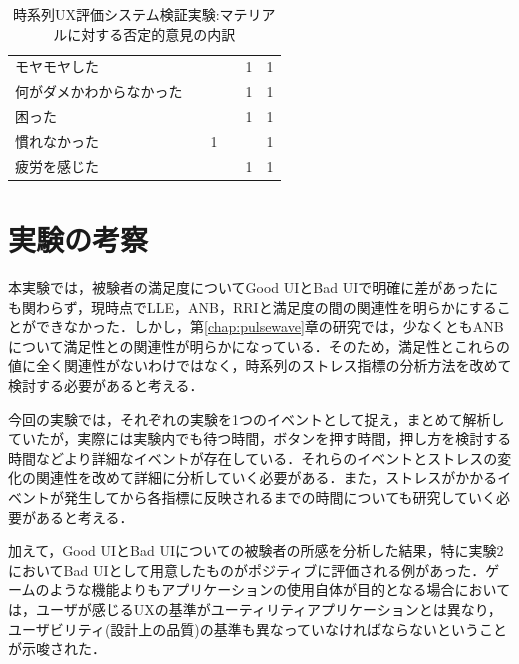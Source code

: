 \begin{table}[htbp]
\begin{tabular}{lrrrrr}
モヤモヤした       &                             &                            &                             & 1                          & 1                                       \\
何がダメかわからなかった &                             &                            &                             & 1                          & 1                                       \\
困った          &                             &                            &                             & 1                          & 1                                       \\
慣れなかった       &                             & 1                          &                             &                            & 1                                       \\
疲労を感じた       &                             &                            &                             & 1                          & 1                                      \\ \hline
\end{tabular}
\caption{時系列UX評価システム検証実験:マテリアルに対する否定的意見の内訳}
\label{table:nega}
\end{table}

\section{実験の考察}

本実験では，被験者の満足度についてGood UIとBad UIで明確に差があったにも関わらず，現時点でLLE，ANB，RRIと満足度の間の関連性を明らかにすることができなかった．しかし，第\ref{chap:pulsewave}章の研究では，少なくともANBについて満足性との関連性が明らかになっている．そのため，満足性とこれらの値に全く関連性がないわけではなく，時系列のストレス指標の分析方法を改めて検討する必要があると考える．

今回の実験では，それぞれの実験を1つのイベントとして捉え，まとめて解析していたが，実際には実験内でも待つ時間，ボタンを押す時間，押し方を検討する時間などより詳細なイベントが存在している．それらのイベントとストレスの変化の関連性を改めて詳細に分析していく必要がある．また，ストレスがかかるイベントが発生してから各指標に反映されるまでの時間についても研究していく必要があると考える．

加えて，Good UIとBad UIについての被験者の所感を分析した結果，特に実験2においてBad UIとして用意したものがポジティブに評価される例があった．ゲームのような機能よりもアプリケーションの使用自体が目的となる場合においては，ユーザが感じるUXの基準がユーティリティアプリケーションとは異なり，ユーザビリティ(設計上の品質)の基準も異なっていなければならないということが示唆された．



